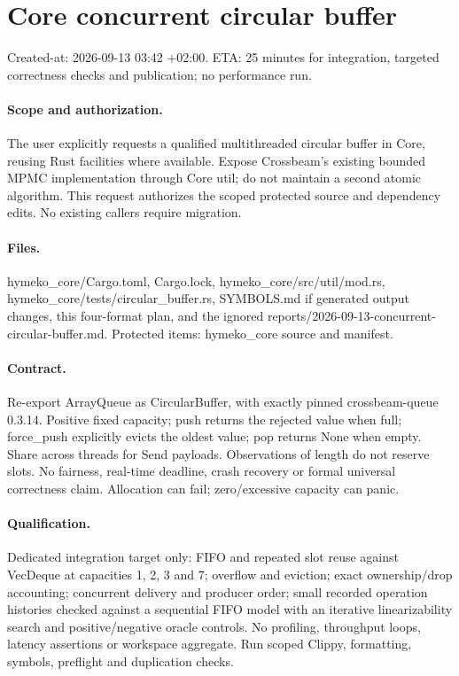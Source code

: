 \documentclass{article}
\begin{document}
\section*{Core concurrent circular buffer}
Created-at: 2026-09-13 03:42 +02:00. ETA: 25 minutes for integration,
targeted correctness checks and publication; no performance run.

\paragraph{Scope and authorization.} The user explicitly requests a qualified
multithreaded circular buffer in Core, reusing Rust facilities where available.
Expose Crossbeam's existing bounded MPMC implementation through Core util;
do not maintain a second atomic algorithm. This request authorizes the scoped
protected source and dependency edits. No existing callers require migration.

\paragraph{Files.} hymeko\_core/Cargo.toml, Cargo.lock,
hymeko\_core/src/util/mod.rs, hymeko\_core/tests/circular\_buffer.rs,
SYMBOLS.md if generated output changes, this four-format plan, and the ignored
reports/2026-09-13-concurrent-circular-buffer.md.
Protected items: hymeko\_core source and manifest.

\paragraph{Contract.} Re-export ArrayQueue as CircularBuffer, with exactly pinned
crossbeam-queue 0.3.14. Positive fixed capacity; push returns the rejected value
when full; force\_push explicitly evicts the oldest value; pop returns None when
empty. Share across threads for Send payloads. Observations of length do not
reserve slots. No fairness, real-time deadline, crash recovery or formal universal
correctness claim. Allocation can fail; zero/excessive capacity can panic.

\paragraph{Qualification.} Dedicated integration target only: FIFO and repeated
slot reuse against VecDeque at capacities 1, 2, 3 and 7; overflow and eviction;
exact ownership/drop accounting; concurrent delivery and producer order;
small recorded operation histories checked against a sequential FIFO model
with an iterative linearizability search and positive/negative oracle controls.
No profiling, throughput loops, latency assertions or workspace aggregate.
Run scoped Clippy, formatting, symbols, preflight and duplication checks.
\end{document}
